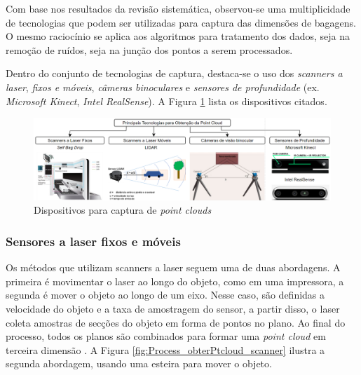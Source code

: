     Com base nos resultados da revisão sistemática, observou-se uma multiplicidade de tecnologias que podem ser utilizadas para captura das dimensões de bagagens. O mesmo raciocínio se aplica aos algoritmos para tratamento dos dados, seja na remoção de ruídos, seja na junção dos pontos a serem processados. 

    Dentro do conjunto de tecnologias de captura, destaca-se o uso dos \textit{scanners a laser}, \textit{fixos e móveis}, \textit{câmeras binoculares} e \textit{sensores de profundidade} (ex. \textit{Microsoft Kinect}, \textit{Intel RealSense}).  A Figura \ref{fig:Disp_captura_ptClouds} lista os dispositivos citados.

        \begin{figure}[h]
           \centering
           \includegraphics[width=1\textwidth]{imagens/Dispositivos_Para_captura_de_pt_Clouds.png} 
           \caption{Dispositivos para captura de \textit{point clouds}}
           \label{fig:Disp_captura_ptClouds}
        \end{figure}


\subsubsection{Sensores a laser fixos e móveis}
\label{subsec_Sensores a laser fixos e moveis}

    Os métodos que utilizam scanners a laser seguem uma de duas abordagens. A primeira é movimentar o laser ao longo do objeto, como em uma impressora, a segunda é mover o objeto ao longo de um eixo. Nesse caso, são definidas a velocidade do objeto e a taxa de amostragem do sensor, a partir disso, o laser coleta amostras de secções do objeto em forma de pontos no plano. Ao final do processo, todos os planos são combinados para formar uma \textit{point cloud} em terceira dimensão \cite{gao_2018_minimum, hyypp_2020_accurate}. A Figura \ref{fig:Process_obterPtcloud_scanner} ilustra a segunda abordagem, usando uma esteira para mover o objeto.  

